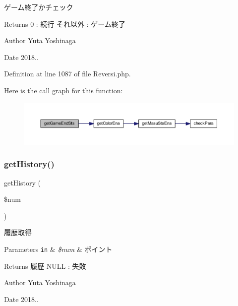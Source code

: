 ゲーム終了かチェック 

\begin{DoxyReturn}{Returns}
0 \+: 続行 それ以外 \+: ゲーム終了 
\end{DoxyReturn}
\begin{DoxyAuthor}{Author}
Yuta Yoshinaga 
\end{DoxyAuthor}
\begin{DoxyDate}{Date}
2018.. 
\end{DoxyDate}


Definition at line 1087 of file Reversi.\+php.

Here is the call graph for this function\+:\nopagebreak
\begin{figure}[H]
\begin{center}
\leavevmode
\includegraphics[width=350pt]{class_reversi_aab9985c789e464de6cf99d7d725cb5a3_cgraph}
\end{center}
\end{figure}
\mbox{\label{class_reversi_a41cae82a798f2b3d0684bda44b837fcf}} 
\subsubsection{\texorpdfstring{get\+History()}{getHistory()}}
{\footnotesize\ttfamily get\+History (\begin{DoxyParamCaption}\item[{}]{\$num }\end{DoxyParamCaption})}



履歴取得 


\begin{DoxyParams}[1]{Parameters}
\mbox{\tt in}  & {\em \$num} & ポイント \\
\hline
\end{DoxyParams}
\begin{DoxyReturn}{Returns}
履歴 N\+U\+LL \+: 失敗 
\end{DoxyReturn}
\begin{DoxyAuthor}{Author}
Yuta Yoshinaga 
\end{DoxyAuthor}
\begin{DoxyDate}{Date}
2018.. 
\end{DoxyDate}


